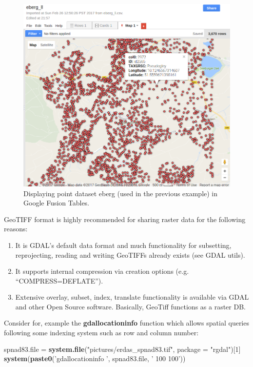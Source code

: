 \documentclass[10pt,b5paper,]{book}
\newenvironment{Shaded}{\begin{snugshade}}{\end{snugshade}}
\newcommand{\DataTypeTok}[1]{\textcolor[rgb]{0.13,0.29,0.53}{#1}}
\newcommand{\DecValTok}[1]{\textcolor[rgb]{0.00,0.00,0.81}{#1}}
\newcommand{\KeywordTok}[1]{\textcolor[rgb]{0.13,0.29,0.53}{\textbf{#1}}}
\newcommand{\NormalTok}[1]{#1}
\newcommand{\StringTok}[1]{\textcolor[rgb]{0.31,0.60,0.02}{#1}}
\providecommand{\tightlist}{%
  \setlength{\itemsep}{0pt}\setlength{\parskip}{0pt}}
\theoremstyle{definition}
\theoremstyle{definition}
\theoremstyle{definition}
\theoremstyle{remark}
\begin{document}
\begin{figure}
\centering
\includegraphics{images/Data_sharing_eberg.png}
\caption{Displaying point dataset eberg (used in the previous example)
in Google Fusion Tables.}
\end{figure}

GeoTIFF format is highly recommended for sharing raster data for the
following reasons:

\begin{enumerate}
\def\labelenumi{\arabic{enumi}.}
\tightlist
\item
  It is GDAL's default data format and much functionality for
  subsetting, reprojecting, reading and writing GeoTIFFs already exists
  (see GDAL utils).
\item
  It supports internal compression via creation options (e.g.
  ``COMPRESS=DEFLATE'').
\item
  Extensive overlay, subset, index, translate functionality is available
  via GDAL and other Open Source software. Basically, GeoTiff functions
  as a raster DB.
\end{enumerate}

Consider for, example the \textbf{gdallocationinfo} function which
allows spatial queries following some indexing system such as row and
column number:

\begin{Shaded}
\begin{Highlighting}[]
\NormalTok{spnad83.file =}\StringTok{ }\KeywordTok{system.file}\NormalTok{(}\StringTok{"pictures/erdas_spnad83.tif"}\NormalTok{, }
                           \DataTypeTok{package =} \StringTok{"rgdal"}\NormalTok{)[}\DecValTok{1}\NormalTok{]}
\KeywordTok{system}\NormalTok{(}\KeywordTok{paste0}\NormalTok{(}\StringTok{'gdallocationinfo '}\NormalTok{, spnad83.file, }\StringTok{' 100 100'}\NormalTok{))}
\end{Highlighting}
\end{Shaded}
\end{document}
